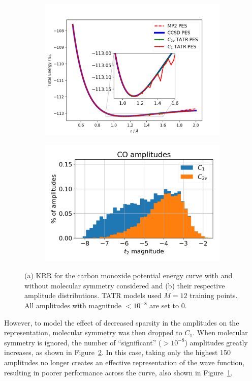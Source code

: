 \begin{figure}
    \begin{subfigure}{.5\textwidth}
        \centering
        \includegraphics[scale=.5]{p2/figures/co_pes.png}
        \caption{}
        \label{fig:both_co_pes}
    \end{subfigure}
    \begin{subfigure}{.5\textwidth}
        \centering
        \includegraphics[scale=.5]{p2/figures/amp_dist.png}
        \caption{}
        \label{fig:amp_dist}
    \end{subfigure}
    \caption{(a) KRR for the carbon monoxide potential energy curve with and without molecular symmetry considered and (b) their respective amplitude distributions. TATR models used $M = 12$ training points. All amplitudes with magnitude $< 10^{-8}$ are set to 0.}
    \label{fig:CO_PES}
\end{figure}
However, to model the effect of decreased sparsity in the amplitudes on the representation, molecular symmetry was then dropped to $C_1$. When molecular symmetry is ignored, the number of ``significant'' ($>10^{-8}$) amplitudes greatly increases, as shown in Figure~\ref{fig:amp_dist}. 
In this case, taking only the highest 150 amplitudes no longer creates an effective representation of the wave function, resulting in poorer performance across the curve, also shown in Figure~\ref{fig:both_co_pes}.

